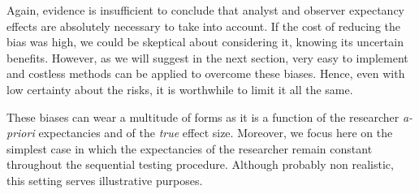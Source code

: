 \documentclass[a4paper,man,natbib,floatsintext,donotrepeattitle]{apa6}
\begin{document}
\vspace{5mm}

\begin{table}[H]
\centering
\caption{Possible interactions between true effect size and a priori beliefs during a sequential testing procedure. Congruent observations are expected to increase the speed of threshold reaching (H0+ and H1+), while incongruent observations are expected to slow down the process (H0- and H1-), and to increase the number of false alarms.}
\label{tab:pred}
\end{table}

Again, evidence is insufficient to conclude that analyst and observer expectancy effects are absolutely necessary to take into account. If the cost of reducing the bias was high, we could be skeptical about considering it, knowing its uncertain benefits. However, as we will suggest in the next section, very easy to implement and costless methods can be applied to overcome these biases. Hence, even with low certainty about the risks, it is worthwhile to limit it all the same. \par


These biases can wear a multitude of forms as it is a function of the researcher \textit{a-priori} expectancies and of the \textit{true} effect size. Moreover, we focus here on the simplest case in which the expectancies of the researcher remain constant throughout the sequential testing procedure. Although probably non realistic, this setting serves illustrative purposes.
\end{document}
